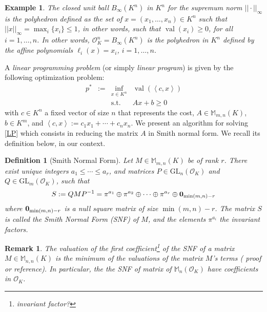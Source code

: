 \documentclass[a4paper,12pt]{article}
\newtheorem{definition}[theorem]{Definition}
\newtheorem{remark}[theorem]{Remark}
\newtheorem{example}[theorem]{Example}
\newcommand{\allmat}{\mathbb{M}} %
\newcommand{\simone}[1]{{\color{blue} #1}} %
\DeclareMathOperator{\val}{val}
\newcommand{\OK}{\mathcal{O}_K}
\newcommand{\GL}{\mathrm{GL}}
\begin{document}
\begin{example}
  The closed unit ball $B_\infty(K^n)$ in $K^n$ for the supremum norm $||\cdot||_{\infty}$ is the
  polyhedron defined as the set of $x=(x_1,\ldots,x_n) \in K^n$ such that $||x||_{\infty} =
  \max_i\{x_i\} \leq 1$, in other words, such that $\val(x_i) \geq 0$, for all $i=1, \ldots, n$.
  In other words, $\OK^n = B_\infty(K^n)$ is the polyhedron in $K^n$ defined by the affine polynomials
  $\ell_i(x)=x_i$, $i=1,\ldots, n$.
\end{example}


A {\it linear programming problem} (or simply {\it linear program}) is given by the following
optimization problem:
\begin{equation}
  \tag{LP}\label{LP}
\begin{array}{rcll}
  p^* & := & \inf_{x \in K^n} & \val(\left\langle c, x \right\rangle) \\
  &    & \text{s.t.}         & A x + b \geq 0
\end{array}
\end{equation}
with $c \in K^n$ a fixed vector of size $n$ that represents the cost, $A \in \allmat_{m,n}(K)$, $b \in K^m$,
and $\left\langle c, x \right\rangle := c_1x_1+\cdots +c_nx_n$.
We present an algorithm for solving \eqref{LP} which consists in reducing the matrix $A$ in Smith normal form.
We recall its definition below, in our context.

\begin{definition}[Smith Normal Form]\label{smith_nf}
  Let $M \in \allmat_{m,n}(K)$ be of rank $r$. There exist unique integers $a_1 \leq \cdots \leq a_r$, and
  matrices $P \in \GL_n(\OK)$ and $Q \in \GL_m(\OK)$, such that
  $$
  S := QMP^{-1} = \pi^{a_1} \oplus \pi^{a_2} \oplus \cdots \oplus \pi^{a_r} \oplus {\bf 0}_{\min(m,n)-r}
  $$
  where ${\bf 0}_{\min(m,n)-r}$ is a null square matrix of size $\min(m,n)-r$.
  The matrix $S$ is called the \emph{Smith Normal Form (SNF)} of $M$, and the elements $\pi^{a_i}$ the
  \emph{invariant factors}.
\end{definition}
\begin{remark}
  The valuation of the first coefficient\footnote{invariant factor?} of the SNF of a matrix
  $M \in \allmat_{n,n} \left( K \right) $ is the minimum of the valuations of the matrix
  $M$'s terms (\simone{proof or reference}). In particular, the the SNF of matrix of $\allmat_n \left( \OK \right) $ have coefficients in $\OK$.
\end{remark}
\end{document}
